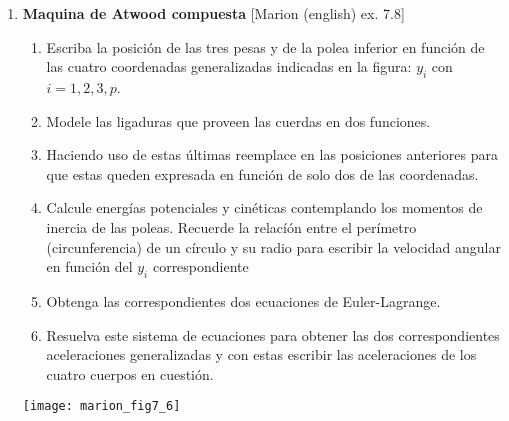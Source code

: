 \documentclass[11pt, spanish, a4paper, twoside]{article}
\begin{document}
\begin{enumerate}
\item
\begin{minipage}[t][10cm]{0.6\textwidth}
	\textbf{Maquina de Atwood compuesta} [Marion (english) ex. 7.8]\\ 
	\begin{enumerate}
		\item Escriba la posición de las tres pesas y de la polea inferior en función de 
		las cuatro coordenadas generalizadas indicadas en la figura: \(y_i\) con \(i = 1,2,3,p\). 
		\item Modele las ligaduras que proveen las cuerdas en dos funciones.
		\item Haciendo uso de estas últimas reemplace en las posiciones anteriores para que estas queden expresada en función de solo dos de las coordenadas.
		\item Calcule energías potenciales y cinéticas contemplando los momentos de inercia de las poleas. Recuerde la relacíón entre el perímetro (circunferencia) de un círculo y su radio para escribir la velocidad angular en función del \(y_i\) correspondiente
		\item Obtenga las correspondientes dos ecuaciones de Euler-Lagrange.
		\item Resuelva este sistema de ecuaciones para obtener las dos correspondientes aceleraciones generalizadas y con estas escribir las aceleraciones de los cuatro cuerpos en cuestión.
	\end{enumerate}
\end{minipage}
\begin{minipage}[c][0cm][t]{0.3\textwidth}
	\texttt{[image: marion\_fig7\_6]}
\end{minipage}



\end{enumerate}
\end{document}
